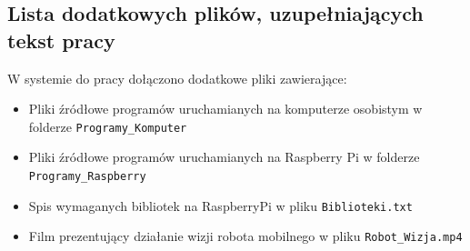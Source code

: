 \documentclass[a4paper,twoside,12pt]{book}
\begin{document}
\begin{appendices}
%





\chapter{Lista dodatkowych plików, uzupełniających tekst pracy} 


W systemie do pracy dołączono dodatkowe pliki zawierające:
\begin{itemize}
    \item Pliki źródłowe programów uruchamianych na komputerze osobistym w folderze \texttt{Programy\_Komputer}
    \item Pliki źródłowe programów uruchamianych na Raspberry Pi w folderze \texttt{Programy\_Raspberry}
    \item Spis wymaganych bibliotek na RaspberryPi w pliku \texttt{Biblioteki.txt} 
    \item Film prezentujący działanie wizji robota mobilnego w pliku \texttt{Robot\_Wizja.mp4}
\end{itemize}


\listoffigures
{}
\listoftables
{}

\end{appendices}
\end{document}
